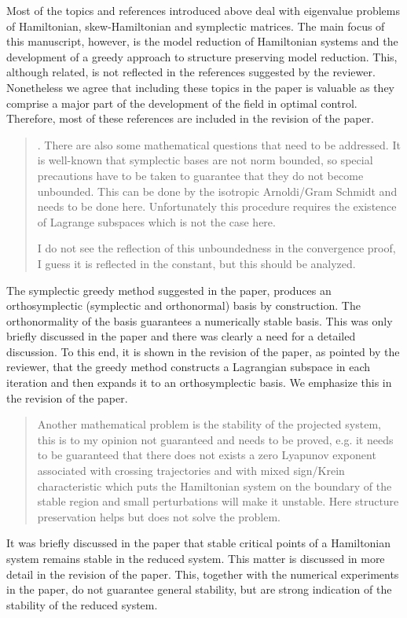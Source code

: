\documentclass[a4paper]{article}
\newcommand{\breview}{\begin{quotation}\begin{bf}\noindent}
\newcommand{\ereview}{\end{bf}\end{quotation}}
\begin{document}
Most of the topics and references introduced above deal with eigenvalue problems of Hamiltonian, skew-Hamiltonian and symplectic matrices. The main focus of this manuscript, however, is the model reduction of Hamiltonian systems and the development of a greedy approach to structure preserving model reduction. This, although related, is not reflected in the references suggested by the reviewer. Nonetheless we agree that including these topics in the paper is valuable as they comprise a major part of the development of the field in optimal control. Therefore, most of these references are included in the revision of the paper.

\breview
2. There are also some mathematical questions that need to be addressed. It is well-known that symplectic bases are not norm bounded, so special precautions have to be taken to guarantee that they do not become unbounded. This can be done by the isotropic Arnoldi/Gram Schmidt and needs to be done here. Unfortunately this procedure requires the existence of Lagrange subspaces which is not the case here.

I do not see the reflection of this unboundedness in the convergence proof, I guess it is reflected in the constant, but this should be analyzed. 
\ereview
The symplectic greedy method suggested in the paper, produces an orthosymplectic (symplectic and orthonormal) basis by construction. The orthonormality of the basis guarantees a numerically stable basis. This was only briefly discussed in the paper and there was clearly a need for a detailed discussion. To this end, it is shown in the revision of the paper, as pointed by the reviewer, that the greedy method constructs a Lagrangian subspace in each iteration and then expands it to an orthosymplectic basis. We emphasize this in the revision of the paper.

\breview
Another mathematical problem is the stability of the projected system, this is to my opinion not guaranteed and needs to be proved, e.g. it needs to be guaranteed that there does not exists a zero Lyapunov exponent associated with crossing trajectories and with mixed sign/Krein characteristic which puts the Hamiltonian system on the boundary of the stable region and small perturbations will make it unstable. Here structure preservation helps but does not solve the problem.
\ereview

It was briefly discussed in the paper that stable critical points of a Hamiltonian system remains stable in the reduced system. This matter is discussed in more detail in the revision of the paper. This, together with the numerical experiments in the paper, do not guarantee general stability, but are strong indication of the stability of the reduced system.
\end{document}

